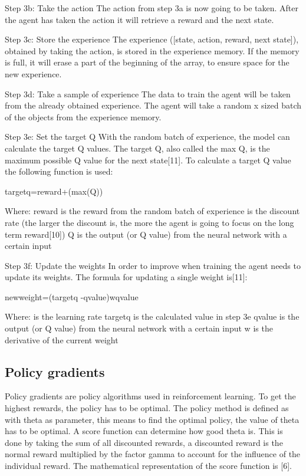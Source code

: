 \documentclass{article}
\begin{document}
Step 3b: Take the action
The action from step 3a is now going to be taken. After the agent has taken the action it will retrieve a reward and the next state. 

Step 3c: Store the experience
The experience ([state, action, reward, next state]), obtained by taking the action, is stored in the experience memory. If the memory is full, it will erase a part of the beginning of the array, to ensure space for the new experience.

Step 3d: Take a sample of experience
The data to train the agent will be taken from the already obtained experience. The agent will take a random x sized batch of the objects from the experience memory. 

Step 3e: Set the target Q
With the random batch of experience, the model can calculate the target Q values. The target Q, also called the max Q, is the maximum possible Q value for the next state[11]. To calculate a target Q value the following function is used:

targetq=reward+(max(Q))

Where:
reward is the reward from the random batch of experience
is the discount rate (the larger the discount is, the more the agent is going to focus on the long term reward[10])
Q is the output (or Q value) from the neural network with a certain input
 
Step 3f: Update the weights
In order to improve when training the agent needs to update its weights. The formula for updating a single weight is[11]:

newweight=(targetq -qvalue)wqvalue

Where:
 is the learning rate 
targetq is the calculated value in step 3e
qvalue is the output (or Q value) from the neural network with a certain input
w is the derivative of the current weight

\subsection{Policy gradients}
Policy gradients are policy algorithms used in reinforcement learning. To get the highest rewards, the policy has to be optimal. The policy method is defined as  with theta as parameter, this means to find the optimal policy, the value of theta has to be optimal. A score function can determine how good theta is. This is done by taking the sum of all discounted rewards, a discounted reward is the normal reward multiplied by the factor gamma to account for the influence of the individual reward. The mathematical representation of the score function is [6]. 
\end{document}
